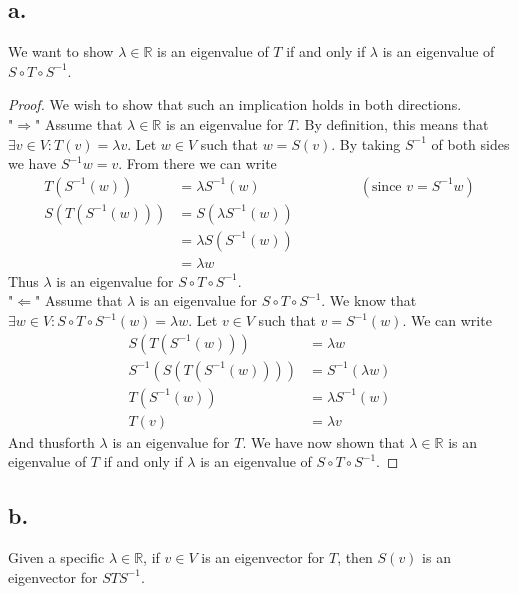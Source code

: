 \documentclass{article}
\begin{document}
	\subsection*{a.}
		We want to show $\lambda \in \mathbb{R}$ is an eigenvalue of $T$ if and only if $\lambda$ is an eigenvalue of $S \circ T \circ S^{-1}$.
		\begin{proof}
			We wish to show that such an implication holds in both directions. \\

			"$\Rightarrow$" Assume that $\lambda \in \mathbb{R}$ is an eigenvalue for $T$.	By definition, this means that $\exists v \in V : T(v) = \lambda v$.
			Let $w \in V$ such that $w = S(v)$. By taking $S^{-1}$ of both sides we have $S^{-1}w = v$. From there we can write
			\begin{align*}
				T(S^{-1}(w)) & = \lambda S^{-1}(w) \ \ \ \ \ \ \ \ \ \ \ \ \ \ \ \ \ \ \ \ \ \ \ \ \ \ \ \ \ \ \ \ ( \text{since $v = S^{-1}w$} ) \\
				S(T(S^{-1}(w))) & = S(\lambda S^{-1}(w)) \\
				& = \lambda S(S^{-1}(w)) \\
				& = \lambda w
			\end{align*} 
			Thus $\lambda$ is an eigenvalue for $S \circ T \circ S^{-1}$. \\ 

			"$\Leftarrow$" Assume that $\lambda$ is an eigenvalue for $S \circ T \circ S^{-1}$. We know that $\exists w \in V : S \circ T \circ S^{-1}(w) = \lambda w$.
			Let $v \in V$ such that $v = S^{-1}(w)$. We can write
			\begin{align*}
				S(T(S^{-1}(w))) & = \lambda w \\
				S^{-1}(S(T(S^{-1}(w)))) & = S^{-1}(\lambda w )\\
				T(S^{-1}(w)) & = \lambda S^{-1}(w) \\
				T(v) & = \lambda v
			\end{align*}
			And thusforth $\lambda$ is an eigenvalue for $T$. We have now shown that $\lambda \in \mathbb{R}$ is an eigenvalue of $T$ if and only if $\lambda$ is an eigenvalue of $S \circ T \circ S^{-1}$.

		\end{proof}

	\subsection*{b.}
		Given a specific $\lambda \in \mathbb{R}$, if $v \in V$ is an eigenvector for $T$, then $S(v)$ is an eigenvector for $STS^{-1}$.
\end{document}
